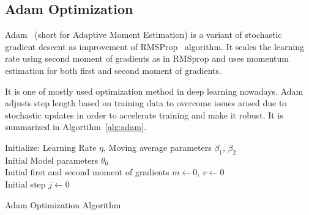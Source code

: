 \subsection{Adam Optimization}

Adam~\cite{kingma_adam_2017}  (short for Adaptive Moment Estimation) is a variant of stochastic gradient descent as improvement of RMSProp~ \cite{hinton_lecture_nodate} algorithm. 
It scales the learning rate using second moment of gradients as in RMSprop and uses momentum estimation for both first and second moment of gradients. 

It is one of mostly used optimization method in deep learning nowadays. 
Adam adjusts step length based on training data to overcome issues arised due to stochastic updates in order to accelerate training and make it robust. 
It is summarized in Algortihm~\ref{alg:adam}. 

\begin{algorithm}[H]
	\SetAlgoLined
	\DontPrintSemicolon %
	Initialize: Learning Rate $\eta$, Moving average parameters $\beta_1$, $\beta_2$\\
	Initial Model parameters $\theta_0$ \\
	Initial first and second moment of gradients $m \leftarrow 0$, $v \leftarrow 0$ \\
	Initial step $j \leftarrow 0$ \\
	\caption{Adam Optimization Algorithm}
	\label{alg:adam}
\end{algorithm}
